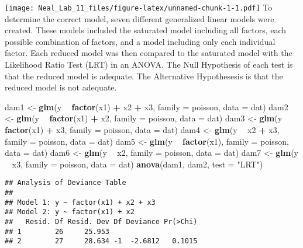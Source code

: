 \documentclass[]{article}
\newenvironment{Shaded}{\begin{snugshade}}{\end{snugshade}}
\newcommand{\KeywordTok}[1]{\textcolor[rgb]{0.13,0.29,0.53}{\textbf{#1}}}
\newcommand{\DataTypeTok}[1]{\textcolor[rgb]{0.13,0.29,0.53}{#1}}
\newcommand{\StringTok}[1]{\textcolor[rgb]{0.31,0.60,0.02}{#1}}
\newcommand{\OperatorTok}[1]{\textcolor[rgb]{0.81,0.36,0.00}{\textbf{#1}}}
\newcommand{\NormalTok}[1]{#1}
\begin{document}
\texttt{[image: Neal\_Lab\_11\_files/figure-latex/unnamed-chunk-1-1.pdf]}
To determine the correct model, seven different generalized linear
models were created. These models included the saturated model including
all factors, each possible combination of factors, and a model including
only each individual factor. Each reduced model was then compared to the
saturated model with the Likelihood Ratio Test (LRT) in an ANOVA. The
Null Hypothesis of each test is that the reduced model is adequate. The
Alternative Hypothesesis is that the reduced model is not adequate.

\begin{Shaded}
\begin{Highlighting}[]
\NormalTok{dam1 <-}\StringTok{ }\KeywordTok{glm}\NormalTok{(y }\OperatorTok{~}\StringTok{ }\KeywordTok{factor}\NormalTok{(x1) }\OperatorTok{+}\StringTok{ }\NormalTok{x2 }\OperatorTok{+}\StringTok{ }\NormalTok{x3, }\DataTypeTok{family =}\NormalTok{ poisson, }\DataTypeTok{data =}\NormalTok{ dat)}
\NormalTok{dam2 <-}\StringTok{ }\KeywordTok{glm}\NormalTok{(y }\OperatorTok{~}\StringTok{ }\KeywordTok{factor}\NormalTok{(x1) }\OperatorTok{+}\StringTok{ }\NormalTok{x2, }\DataTypeTok{family =}\NormalTok{ poisson, }\DataTypeTok{data =}\NormalTok{ dat)}
\NormalTok{dam3 <-}\StringTok{ }\KeywordTok{glm}\NormalTok{(y }\OperatorTok{~}\StringTok{ }\KeywordTok{factor}\NormalTok{(x1) }\OperatorTok{+}\StringTok{ }\NormalTok{x3, }\DataTypeTok{family =}\NormalTok{ poisson, }\DataTypeTok{data =}\NormalTok{ dat)}
\NormalTok{dam4 <-}\StringTok{ }\KeywordTok{glm}\NormalTok{(y }\OperatorTok{~}\StringTok{ }\NormalTok{x2 }\OperatorTok{+}\StringTok{ }\NormalTok{x3, }\DataTypeTok{family =}\NormalTok{ poisson, }\DataTypeTok{data =}\NormalTok{ dat)}
\NormalTok{dam5 <-}\StringTok{ }\KeywordTok{glm}\NormalTok{(y }\OperatorTok{~}\StringTok{ }\KeywordTok{factor}\NormalTok{(x1), }\DataTypeTok{family =}\NormalTok{ poisson, }\DataTypeTok{data =}\NormalTok{ dat)}
\NormalTok{dam6 <-}\StringTok{ }\KeywordTok{glm}\NormalTok{(y }\OperatorTok{~}\StringTok{ }\NormalTok{x2, }\DataTypeTok{family =}\NormalTok{ poisson, }\DataTypeTok{data =}\NormalTok{ dat)}
\NormalTok{dam7 <-}\StringTok{ }\KeywordTok{glm}\NormalTok{(y }\OperatorTok{~}\StringTok{ }\NormalTok{x3, }\DataTypeTok{family =}\NormalTok{ poisson, }\DataTypeTok{data =}\NormalTok{ dat)}
\KeywordTok{anova}\NormalTok{(dam1, dam2, }\DataTypeTok{test =} \StringTok{"LRT"}\NormalTok{)}
\end{Highlighting}
\end{Shaded}

\begin{verbatim}
## Analysis of Deviance Table
## 
## Model 1: y ~ factor(x1) + x2 + x3
## Model 2: y ~ factor(x1) + x2
##   Resid. Df Resid. Dev Df Deviance Pr(>Chi)
## 1        26     25.953                     
## 2        27     28.634 -1  -2.6812   0.1015
\end{verbatim}
\end{document}

